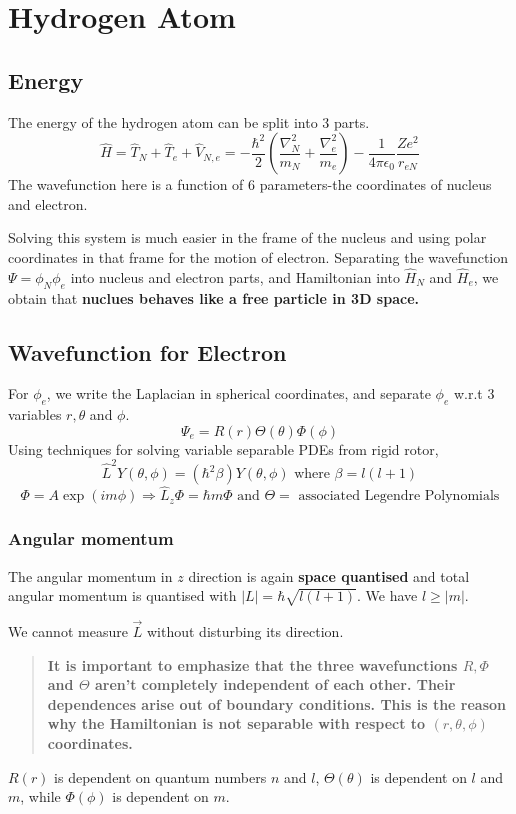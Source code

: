 \documentclass[12pt]{article}
\begin{document}
\section{Hydrogen Atom}
\subsection*{Energy}
The energy of the hydrogen atom can be split into 3 parts. 
\[\hat{H}=\hat{T}_N+\hat{T}_e+\hat{V}_{N,e} = -\frac{\hbar^2}{2} \left( \frac{\nabla_N^2}{m_N} + \frac{\nabla_e^2}{m_e}\right) - \frac{1}{4\pi \epsilon_0} \frac{Ze^2}{r_{eN}}\]
The wavefunction here is a function of $6$ parameters-the coordinates of nucleus and electron.

Solving this system is much easier in the frame of the nucleus and using polar coordinates in that frame for the motion of electron.
Separating the wavefunction $\Psi= \phi_N \phi_e$ into nucleus and electron parts, and Hamiltonian into $\hat{H}_N$ and $\hat{H}_e$, we obtain that \textbf{nuclues behaves like a free particle in 3D space.} 
\subsection*{Wavefunction for Electron}
For $\phi_e$, we write the Laplacian in spherical coordinates, and separate $\phi_e$ w.r.t 3 variables $r, \theta$ and $\phi$.\[\Psi_e = R(r) \Theta(\theta) \Phi(\phi)\]
Using techniques for solving variable separable PDEs from rigid rotor, 
\[\hat{L}^2 Y(\theta, \phi) = (\hbar^2 \beta) Y(\theta, \phi) \text{ where } \beta = l(l+1)\]
\[\Phi=A \exp(im\phi) \Rightarrow \hat{L}_z \Phi = \hbar m \Phi\text{ and } \Theta = \text{ associated Legendre Polynomials}\]
\subsubsection*{Angular momentum}
The angular momentum in $z$ direction is again \textbf{space quantised} and total angular momentum is quantised with $|L|=\hbar \sqrt{l(l+1)}$. We have $l \geq |m|$. 

We cannot measure $\Vec{L}$ without disturbing its direction. 
\begin{quote}
    \textbf{It is important to emphasize that the three wavefunctions $R, \Phi$ and $\Theta$ aren't completely independent of each other. Their dependences arise out of boundary conditions. This is the reason why the Hamiltonian is not separable with respect to  $(r, \theta, \phi)$ coordinates.} 
\end{quote}
$R(r)$ is dependent on quantum numbers $n$ and $l$, $\Theta (\theta)$ is dependent on $l$ and $m$, while $\Phi(\phi)$ is dependent on $m$.
\end{document}
